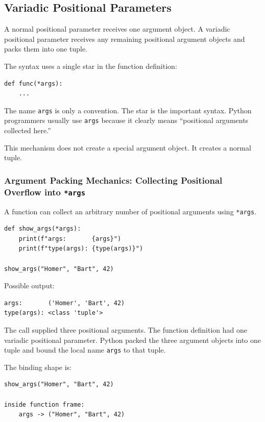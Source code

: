 \subsection{Variadic Positional Parameters}

A normal positional parameter receives one argument object. A variadic positional parameter receives any remaining positional argument objects and packs them into one tuple.

The syntax uses a single star in the function definition:

\begin{verbatim}
def func(*args):
    ...
\end{verbatim}

The name \texttt{args} is only a convention. The star is the important syntax. Python programmers usually use \texttt{args} because it clearly means ``positional arguments collected here.''

This mechanism does not create a special argument object. It creates a normal tuple.

\subsubsection{Argument Packing Mechanics: Collecting Positional Overflow into \texttt{*args}}

A function can collect an arbitrary number of positional arguments using \texttt{*args}.

\begin{verbatim}
def show_args(*args):
    print(f"args:       {args}")
    print(f"type(args): {type(args)}")

show_args("Homer", "Bart", 42)
\end{verbatim}

Possible output:

\begin{verbatim}
args:       ('Homer', 'Bart', 42)
type(args): <class 'tuple'>
\end{verbatim}

The call supplied three positional arguments. The function definition had one variadic positional parameter. Python packed the three argument objects into one tuple and bound the local name \texttt{args} to that tuple.

The binding shape is:

\begin{verbatim}
show_args("Homer", "Bart", 42)

inside function frame:
    args -> ("Homer", "Bart", 42)
\end{verbatim}

